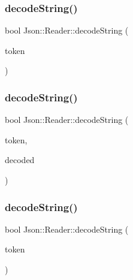 \subsubsection{\texorpdfstring{decode\+String()}{decodeString()}\hspace{0.1cm}{\footnotesize\ttfamily [1/4]}}
{\footnotesize\ttfamily bool Json\+::\+Reader\+::decode\+String (\begin{DoxyParamCaption}\item[{\hyperlink{class_json_1_1_reader_1_1_token}{Token} \&}]{token }\end{DoxyParamCaption})\hspace{0.3cm}{\ttfamily [private]}}

\hypertarget{class_json_1_1_reader_a8911a3225ee94d86d83edc2f8c1befe0}{}\label{class_json_1_1_reader_a8911a3225ee94d86d83edc2f8c1befe0} 
\subsubsection{\texorpdfstring{decode\+String()}{decodeString()}\hspace{0.1cm}{\footnotesize\ttfamily [2/4]}}
{\footnotesize\ttfamily bool Json\+::\+Reader\+::decode\+String (\begin{DoxyParamCaption}\item[{\hyperlink{class_json_1_1_reader_1_1_token}{Token} \&}]{token,  }\item[{\hyperlink{config_8h_a1e723f95759de062585bc4a8fd3fa4be}{J\+S\+O\+N\+C\+P\+P\+\_\+\+S\+T\+R\+I\+NG} \&}]{decoded }\end{DoxyParamCaption})\hspace{0.3cm}{\ttfamily [private]}}

\hypertarget{class_json_1_1_reader_aaf736937912f5c9b8d221e57f209e3e0}{}\label{class_json_1_1_reader_aaf736937912f5c9b8d221e57f209e3e0} 
\subsubsection{\texorpdfstring{decode\+String()}{decodeString()}\hspace{0.1cm}{\footnotesize\ttfamily [3/4]}}
{\footnotesize\ttfamily bool Json\+::\+Reader\+::decode\+String (\begin{DoxyParamCaption}\item[{\hyperlink{class_json_1_1_reader_1_1_token}{Token} \&}]{token }\end{DoxyParamCaption})\hspace{0.3cm}{\ttfamily [private]}}



